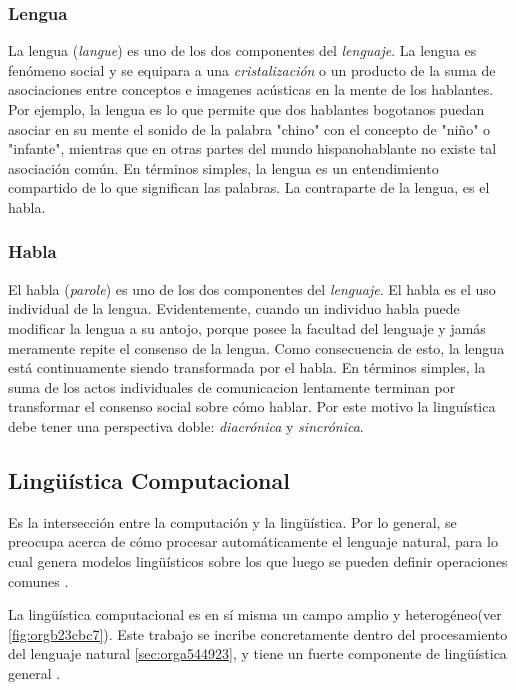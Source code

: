 \documentclass[12pt,letterpaper,twoside]{article}
\begin{document}
\subsubsection{Lengua}
\label{sec:orge958c5a}

La lengua (\emph{langue}) es uno de los dos componentes del
\emph{lenguaje}.  La lengua es fenómeno social y se equipara a una
\emph{cristalización} o un producto de la suma de asociaciones entre
conceptos e imagenes acústicas en la mente de los hablantes. Por
ejemplo, la lengua es lo que permite que dos hablantes bogotanos
puedan asociar en su mente el sonido de la palabra "chino" con el
concepto de "niño" o "infante", mientras que en otras partes del
mundo hispanohablante no existe tal asociación común.
En términos simples, la lengua es un entendimiento compartido de
lo que significan las palabras. La contraparte de la lengua,
es el habla. 

\subsubsection{Habla}
\label{sec:orgac4bef6}
El habla (\emph{parole}) es uno de los dos componentes del
\emph{lenguaje}. El habla es el uso individual de la lengua.
Evidentemente, cuando un individuo habla puede modificar
la lengua a su antojo, porque posee la facultad del
lenguaje y jamás meramente repite el consenso de la lengua.
Como consecuencia de esto, la lengua está continuamente
siendo transformada por el habla. En términos simples,
la suma de los actos individuales de comunicacion lentamente
terminan por transformar el consenso social sobre cómo
hablar.  Por este motivo la linguística debe tener una
perspectiva doble: \emph{diacrónica} y \emph{sincrónica}.


\subsection{Lingüística Computacional}
\label{sec:org50242e5}

Es la intersección entre la computación y la lingüística. Por lo
general, se preocupa acerca de cómo procesar automáticamente el
lenguaje natural, para lo cual genera modelos lingüísticos sobre los
que luego se pueden definir operaciones comunes \cite{gelbukh2004}.


La lingüística computacional es en sí misma un campo amplio y
heterogéneo(ver \ref{fig:orgb23cbc7}).
Este trabajo se incribe concretamente dentro del procesamiento
del lenguaje natural \ref{sec:orga544923}, y tiene un fuerte componente de
lingüística general .
\end{document}
